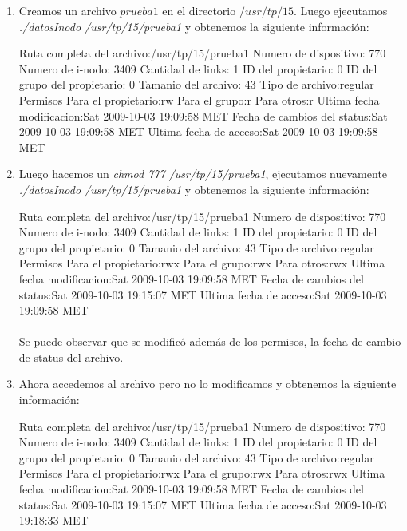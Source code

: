 \begin{enumerate}
	\item Creamos un archivo $prueba1$ en el directorio $/usr/tp/15$. Luego ejecutamos 
    \emph{./datosInodo /usr/tp/15/prueba1} y obtenemos la siguiente informaci\'on:

\begin{scriptsize} 
\begin{verbatimtab} 
Ruta completa del archivo:/usr/tp/15/prueba1
Numero de dispositivo: 770
Numero de i-nodo: 3409
Cantidad de links: 1
ID del propietario: 0
ID del grupo del propietario: 0
Tamanio del archivo: 43
Tipo de archivo:regular
Permisos
	 Para el propietario:rw
	 Para el grupo:r
	 Para otros:r
Ultima fecha modificacion:Sat 2009-10-03 19:09:58 MET
Fecha de cambios del status:Sat 2009-10-03 19:09:58 MET
Ultima fecha de acceso:Sat 2009-10-03 19:09:58 MET
\end{verbatimtab} 
\end{scriptsize} 


\item Luego hacemos un \emph{chmod 777 /usr/tp/15/prueba1}, ejecutamos nuevamente\\
\emph{./datosInodo /usr/tp/15/prueba1} y obtenemos la siguiente informaci\'on:

\begin{scriptsize} 
\begin{verbatimtab} 
Ruta completa del archivo:/usr/tp/15/prueba1
Numero de dispositivo: 770
Numero de i-nodo: 3409
Cantidad de links: 1
ID del propietario: 0
ID del grupo del propietario: 0
Tamanio del archivo: 43
Tipo de archivo:regular
Permisos
	 Para el propietario:rwx
	 Para el grupo:rwx
	 Para otros:rwx
Ultima fecha modificacion:Sat 2009-10-03 19:09:58 MET
Fecha de cambios del status:Sat 2009-10-03 19:15:07 MET
Ultima fecha de acceso:Sat 2009-10-03 19:09:58 MET
\end{verbatimtab} 
\end{scriptsize} 


\paragraph{} Se puede observar que se modific\'o adem\'as de los permisos, la fecha de cambio de status del archivo.

\item Ahora accedemos al archivo pero no lo modificamos y obtenemos la siguiente informaci\'on:
\begin{scriptsize} 
\begin{verbatimtab} 
Ruta completa del archivo:/usr/tp/15/prueba1
Numero de dispositivo: 770
Numero de i-nodo: 3409
Cantidad de links: 1
ID del propietario: 0
ID del grupo del propietario: 0
Tamanio del archivo: 43
Tipo de archivo:regular
Permisos
	 Para el propietario:rwx
	 Para el grupo:rwx
	 Para otros:rwx
Ultima fecha modificacion:Sat 2009-10-03 19:09:58 MET
Fecha de cambios del status:Sat 2009-10-03 19:15:07 MET
Ultima fecha de acceso:Sat 2009-10-03 19:18:33 MET
\end{verbatimtab} 
\end{scriptsize} 


\end{enumerate}
